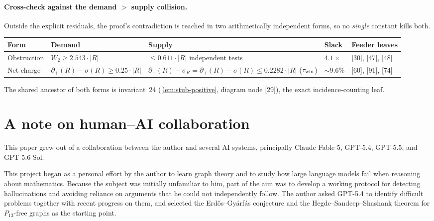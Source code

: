 \documentclass[11pt]{article}
\newcommand{\defp}{\partial_+}
\begin{document}
\paragraph{Cross-check against the demand $>$ supply collision.}
Outside the explicit residuals, the proof's contradiction is reached in two
arithmetically independent forms, so no \emph{single} constant kills both.

\begin{center}\small
\begin{tabular}{L{0.12\textwidth} L{0.23\textwidth} L{0.27\textwidth} L{0.07\textwidth} L{0.15\textwidth}}
\toprule
\textbf{Form} & \textbf{Demand} & \textbf{Supply} & \textbf{Slack} & \textbf{Feeder leaves} \\
\midrule
Obstruction & $W_2\ge2.543\cdot|R|$ & $\le0.611\cdot|R|$ independent tests & $4.1\times$ & {[30]}, {[47]}, {[48]} \\
Net charge & $\defp(R)-\sigma(R)\ge0.25\cdot|R|$ & $\defp(R)-\sigma_R=\defp(R)-\sigma(R)\le0.2282\cdot|R|$ ($\tau_{\rm win}$) & $\sim9.6\%$ & {[60]}, {[91]}, {[74]} \\
\bottomrule
\end{tabular}
\end{center}
\noindent The shared ancestor of both forms is invariant~24 (\cref{lem:stub-positive}, diagram node {[29]}), the exact incidence-counting leaf.

\section*{A note on human--AI collaboration}

This paper grew out of a collaboration between the author and several AI
systems, principally Claude Fable 5, GPT-5.4, GPT-5.5, and GPT-5.6-Sol.

This project began as a personal effort by the author to learn graph theory and
to study how large language models fail when reasoning about mathematics.
Because the subject was initially unfamiliar to him, part of the aim was to
develop a working protocol for detecting hallucinations and avoiding reliance
on arguments that he could not independently follow.  The author asked
GPT-5.4 to identify difficult problems together with recent progress on them,
and selected the Erd\H{o}s--Gy\'arf\'as conjecture and the
Hegde--Sandeep--Shashank theorem for $P_{13}$-free graphs as the starting
point.
\end{document}
